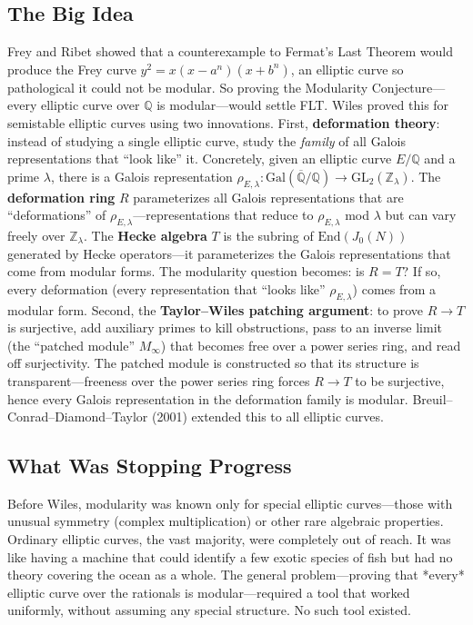 \subsection{The Big Idea}
Frey and Ribet showed that a counterexample to Fermat's Last Theorem would produce the Frey curve $y^2 = x(x-a^n)(x+b^n)$, an elliptic curve so pathological it could not be modular. So proving the Modularity Conjecture---every elliptic curve over $\mathbb{Q}$ is modular---would settle FLT. Wiles proved this for semistable elliptic curves using two innovations. First, \textbf{deformation theory}: instead of studying a single elliptic curve, study the \emph{family} of all Galois representations that ``look like'' it. Concretely, given an elliptic curve $E/\mathbb{Q}$ and a prime $\lambda$, there is a Galois representation $\rho_{E,\lambda}: \text{Gal}(\overline{\mathbb{Q}}/\mathbb{Q}) \to \text{GL}_2(\mathbb{Z}_\lambda)$. The \textbf{deformation ring} $R$ parameterizes all Galois representations that are ``deformations'' of $\rho_{E,\lambda}$---representations that reduce to $\rho_{E,\lambda}$ mod $\lambda$ but can vary freely over $\mathbb{Z}_\lambda$. The \textbf{Hecke algebra} $T$ is the subring of $\text{End}(J_0(N))$ generated by Hecke operators---it parameterizes the Galois representations that come from modular forms. The modularity question becomes: is $R = T$? If so, every deformation (every representation that ``looks like'' $\rho_{E,\lambda}$) comes from a modular form. Second, the \textbf{Taylor--Wiles patching argument}: to prove $R \to T$ is surjective, add auxiliary primes to kill obstructions, pass to an inverse limit (the ``patched module'' $M_\infty$) that becomes free over a power series ring, and read off surjectivity. The patched module is constructed so that its structure is transparent---freeness over the power series ring forces $R \to T$ to be surjective, hence every Galois representation in the deformation family is modular. Breuil--Conrad--Diamond--Taylor (2001) extended this to all elliptic curves.

\subsection{What Was Stopping Progress}
Before Wiles, modularity was known only for special elliptic curves---those with unusual symmetry (complex multiplication) or other rare algebraic properties. Ordinary elliptic curves, the vast majority, were completely out of reach. It was like having a machine that could identify a few exotic species of fish but had no theory covering the ocean as a whole. The general problem---proving that *every* elliptic curve over the rationals is modular---required a tool that worked uniformly, without assuming any special structure. No such tool existed.

